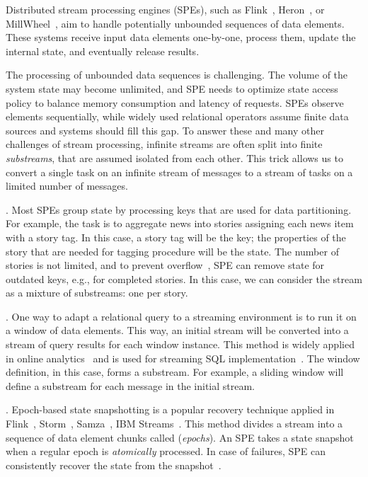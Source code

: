 \label {fs-acker-intro}

Distributed stream processing engines (SPEs), such as Flink~\cite{carbone2015apache}, Heron~\cite{Kulkarni:2015:THS:2723372.2742788}, or MillWheel~\cite{Akidau:2013:MFS:2536222.2536229}, aim to handle potentially unbounded sequences of data elements. These systems receive input data elements one-by-one, process them, update the internal state, and eventually release results. 

The processing of unbounded data sequences is challenging. The volume of the system state may become unlimited, and SPE needs to optimize state access policy to balance memory consumption and latency of requests. SPEs observe elements sequentially, while widely used relational operators assume finite data sources and systems should fill this gap. To answer these and many other challenges of stream processing, infinite streams are often split into finite {\em substreams}, that are assumed isolated from each other. This trick allows us to convert a single task on an infinite stream of messages to a stream of tasks on a limited number of messages.

. Most SPEs group state by processing keys that are used for data partitioning. For example, the task is to aggregate news into stories assigning each news item with a story tag. In this case, a story tag will be the key; the properties of the story that are needed for tagging procedure will be the state. The number of stories is not limited, and to prevent overflow~\cite{Tucker:2003:EPS:776752.776780}, SPE can remove state for outdated keys, e.g., for completed stories. In this case, we can consider the stream as a mixture of substreams: one per story.  

. One way to adapt a relational query to a streaming environment is to run it on a window of data elements. This way, an initial stream will be converted into a stream of query results for each window instance. This method is widely applied in online analytics~\cite{traub2018scotty} and is used for streaming SQL implementation~\cite{Begoli:2019:OSR:3299869.3314040}. The window definition, in this case, forms a substream. For example, a sliding window will define a substream for each message in the initial stream.

. Epoch-based state snapshotting is a popular recovery technique applied in Flink~\cite{Carbone:2017:SMA:3137765.3137777}, Storm~\cite{Toshniwal:2014:STO:2588555.2595641}, Samza~\cite{Noghabi:2017:SSS:3137765.3137770}, IBM Streams~\cite{jacques2016consistent}. This method divides a stream into a sequence of data element chunks called ({\em epochs}). An SPE takes a state snapshot when a regular epoch is {\em atomically} processed. In case of failures, SPE can consistently recover the state from the snapshot~\cite{2015arXiv150608603C}. 

